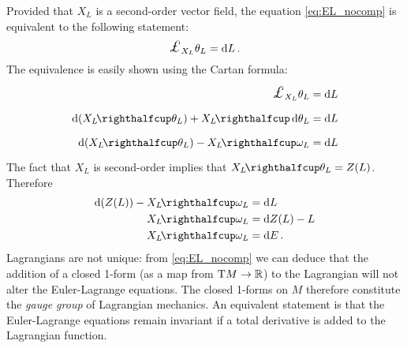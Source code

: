 Provided that $X_L$ is a second-order vector field, the equation \cref{eq:EL_nocomp} is equivalent to the following statement:
\begin{equation}
    \lied{X_L}{\theta_L} = \dd{L}.
\end{equation}
The equivalence is easily shown using the Cartan formula:
\begin{equation*}
    \begin{split}
        \lied{X_L}{\theta_L} &= \dd{L} \\
        \dd{\qty(\intpr{X_L}{\theta_L})} + \intpr{X_L}{\dd{\theta_L}} &= \dd{L} \\
        \dd{\qty(\intpr{X_L}{\theta_L})} - \intpr{X_L}{\omega_L} &= \dd{L}
    \end{split}
\end{equation*}
The fact that $X_L$ is second-order implies that $\intpr{X_L}{\theta_L} = Z(L)$. Therefore 
\begin{equation*}
    \begin{split}
        \dd{(Z(L))} - \intpr{X_L}{\omega_L} &= \dd{L} \\
        \intpr{X_L}{\omega_L} &= \dd{Z(L) - L} \\
        \intpr{X_L}{\omega_L} &= \dd{E}.
    \end{split}
\end{equation*}
Lagrangians are not unique: from \cref{eq:EL_nocomp} we can deduce that the addition of a closed 1-form (as a map from $\mathrm{T}M \to \mathbb{R}$) to the Lagrangian will not alter the Euler-Lagrange equations. The closed 1-forms on $M$  therefore constitute the \emph{gauge group} of Lagrangian mechanics. An equivalent statement is that the Euler-Lagrange equations remain invariant if a total derivative is added to the Lagrangian function. \cite{Abraham1978}
